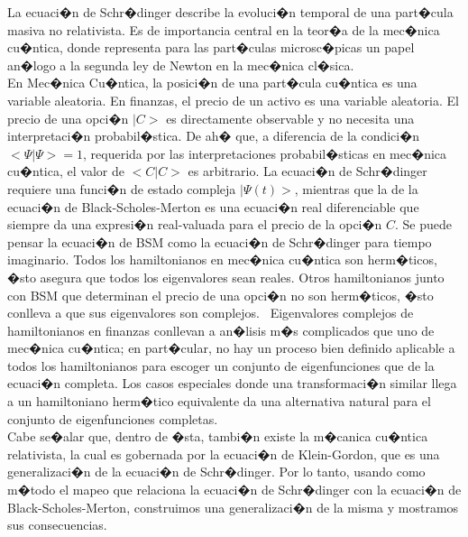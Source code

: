 \documentclass[portrait, a0b,final]{a0poster}%
\numberwithin{equation}{section}
\newenvironment{poster}{
  \begin{center}
  \begin{minipage}[c]{0.98\textwidth}
}{
  \end{minipage}
  \end{center}
}
\newenvironment{pcolumn}[1]{
  \begin{minipage}{#1\textwidth}
  \begin{center}
}{
  \end{center}
  \end{minipage}
}
\newcommand{\pbox}[4]{
\psshadowbox[#3]{
\begin{minipage}[t][#2][t]{#1}
#4
\end{minipage}
}}
\begin{document}
\begin{poster}
\begin{center}
\begin{pcolumn}{0.32}
{     


La ecuaci�n de Schr�dinger describe la evoluci�n temporal de una part�cula masiva no relativista. Es de importancia central en la teor�a de la mec�nica cu�ntica, donde representa para las part�culas microsc�picas un papel an�logo a la segunda ley de Newton en la mec�nica cl�sica.\\


En Mec�nica Cu�ntica, la posici�n de una part�cula cu�ntica es una variable aleatoria. En finanzas, el precio de un activo es una variable aleatoria.
El precio de una opci�n $|C>$ es directamente observable y no necesita una interpretaci�n probabil�stica. De ah� que, a diferencia de la condici�n $<\Psi |\Psi>=1$, requerida por las interpretaciones probabil�sticas en mec�nica cu�ntica, el valor de $<C|C>$ es arbitrario.
 La ecuaci�n de Schr�dinger requiere una funci�n de estado compleja $|\Psi(t)>$, mientras que la de la ecuaci�n de Black-Scholes-Merton es una ecuaci�n real diferenciable que siempre da una expresi�n real-valuada para el precio de la opci�n $C$. Se puede pensar la ecuaci�n de BSM como la ecuaci�n de Schr�dinger para tiempo imaginario.
Todos los hamiltonianos en mec�nica cu�ntica son herm�ticos, �sto asegura que todos los eigenvalores sean reales. Otros hamiltonianos junto con BSM que determinan el precio de una opci�n no son herm�ticos, �sto conlleva  a que sus eigenvalores son complejos.
\ Eigenvalores complejos de hamiltonianos en finanzas conllevan a an�lisis m�s complicados que uno de mec�nica cu�ntica; en part�cular, no hay un proceso bien definido aplicable a todos los hamiltonianos para escoger un conjunto de eigenfunciones que de la ecuaci�n completa. Los casos especiales donde una transformaci�n similar llega a un hamiltoniano herm�tico equivalente da una alternativa natural para el conjunto de eigenfunciones completas.\\

Cabe se�alar que, dentro de �sta, tambi�n existe la m�canica cu�ntica 
     relativista, la cual es gobernada por la ecuaci�n de Klein-Gordon, 
     que es una generalizaci�n de la ecuaci�n de Schr�dinger. Por lo 
     tanto, usando como m�todo el mapeo que relaciona la ecuaci�n de 
     Schr�dinger con la ecuaci�n de Black-Scholes-Merton, construimos una 
     generalizaci�n de la misma y mostramos sus consecuencias.
   }
\end{pcolumn}
\begin{pcolumn}{0.32}
\pbox{0.9\textwidth}{95cm}{linewidth=2mm,framearc=0.1,linecolor=lightblue,fillstyle=gradient,gradangle=0,gradbegin=white,gradend=white,gradmidpoint=1.0,framesep=1em}{


}
\end{pcolumn}
\end{center}
\end{poster}
\end{document}
